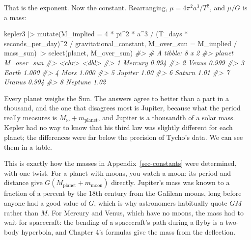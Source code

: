 \documentclass[
  10.5pt,
  letterpaper,
]{scrbook}
\newenvironment{Shaded}{\begin{snugshade}}{\end{snugshade}}
\newcommand{\AttributeTok}[1]{\textcolor[rgb]{0.00,0.00,0.00}{#1}}
\newcommand{\CommentTok}[1]{\textcolor[rgb]{0.00,0.00,0.00}{\textit{#1}}}
\newcommand{\DecValTok}[1]{\textcolor[rgb]{0.00,0.00,0.00}{#1}}
\newcommand{\FunctionTok}[1]{\textcolor[rgb]{0.00,0.00,0.00}{#1}}
\newcommand{\NormalTok}[1]{\textcolor[rgb]{0.00,0.00,0.00}{#1}}
\newcommand{\SpecialCharTok}[1]{\textcolor[rgb]{0.00,0.00,0.00}{#1}}
\theoremstyle{definition}
\theoremstyle{plain}
\theoremstyle{remark}
\begin{document}
That is the exponent. Now the constant. Rearranging,
\(\mu = 4\pi^2 a^3/T^2\), and \(\mu/G\) is a mass:

\begin{Shaded}
\begin{Highlighting}[]
\NormalTok{kepler3 }\SpecialCharTok{|\textgreater{}}
  \FunctionTok{mutate}\NormalTok{(}\AttributeTok{M\_implied =} \DecValTok{4} \SpecialCharTok{*}\NormalTok{ pi}\SpecialCharTok{\^{}}\DecValTok{2} \SpecialCharTok{*}\NormalTok{ a}\SpecialCharTok{\^{}}\DecValTok{3} \SpecialCharTok{/}\NormalTok{ (T\_days }\SpecialCharTok{*}\NormalTok{ seconds\_per\_day)}\SpecialCharTok{\^{}}\DecValTok{2} \SpecialCharTok{/}
\NormalTok{                     gravitational\_constant,}
         \AttributeTok{M\_over\_sun =}\NormalTok{ M\_implied }\SpecialCharTok{/}\NormalTok{ mass\_sun) }\SpecialCharTok{|\textgreater{}}
  \FunctionTok{select}\NormalTok{(planet, M\_over\_sun)}
\CommentTok{\#\textgreater{} \# A tibble: 8 x 2}
\CommentTok{\#\textgreater{}   planet  M\_over\_sun}
\CommentTok{\#\textgreater{}   \textless{}chr\textgreater{}        \textless{}dbl\textgreater{}}
\CommentTok{\#\textgreater{} 1 Mercury      0.994}
\CommentTok{\#\textgreater{} 2 Venus        0.999}
\CommentTok{\#\textgreater{} 3 Earth        1.000}
\CommentTok{\#\textgreater{} 4 Mars         1.000}
\CommentTok{\#\textgreater{} 5 Jupiter      1.00 }
\CommentTok{\#\textgreater{} 6 Saturn       1.01 }
\CommentTok{\#\textgreater{} 7 Uranus       0.994}
\CommentTok{\#\textgreater{} 8 Neptune      1.02}
\end{Highlighting}
\end{Shaded}

Every planet weighs the Sun. The answers agree to better than a part in
a thousand, and the one that disagrees most is Jupiter, because what the
period really measures is \(M_\odot + m_{\mathrm{planet}}\), and Jupiter
is a thousandth of a solar mass. Kepler had no way to know that his
third law was slightly different for each planet; the differences were
far below the precision of Tycho's data. We can see them in a table.

\begin{tcolorbox}[enhanced jigsaw, arc=.35mm, bottomrule=.15mm, bottomtitle=1mm, breakable, colback=white, colbacktitle=quarto-callout-note-color!10!white, colframe=quarto-callout-note-color-frame, coltitle=black, left=2mm, leftrule=.75mm, opacityback=0, opacitybacktitle=0.6, rightrule=.15mm, title={Where it comes from}, titlerule=0mm, toprule=.15mm, toptitle=1mm]

This is exactly how the masses in Appendix~\ref{sec-constants} were
determined, with one twist. For a planet with moons, you watch a moon:
its period and distance give
\(G(M_{\mathrm{planet}} + m_{\mathrm{moon}})\) directly. Jupiter's mass
was known to a fraction of a percent by the 18th century from the
Galilean moons, long before anyone had a good value of \(G\), which is
why astronomers habitually quote \(GM\) rather than \(M\). For Mercury
and Venus, which have no moons, the mass had to wait for spacecraft: the
bending of a spacecraft's path during a flyby is a two-body hyperbola,
and Chapter 4's formulas give the mass from the deflection.

\end{tcolorbox}
\end{document}
